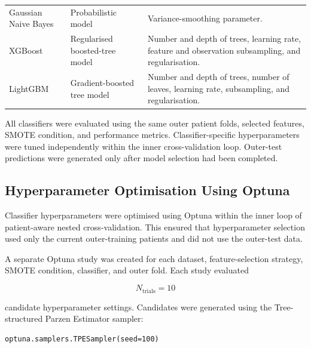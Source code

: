 \documentclass[12pt,twocolumn]{article}
\begin{document}
\begin{table}[htbp]
\begin{tabular}{p{3.1cm} p{3.7cm} p{8.9cm}}
Gaussian Naive Bayes &
Probabilistic model &
Variance-smoothing parameter. \\

XGBoost &
Regularised boosted-tree model &
Number and depth of trees, learning rate, feature and observation
subsampling, and regularisation. \\

LightGBM &
Gradient-boosted tree model &
Number and depth of trees, number of leaves, learning rate,
subsampling, and regularisation. \\

\bottomrule
\end{tabular}
\end{table}

All classifiers were evaluated using the same outer patient folds,
selected features, SMOTE condition, and performance metrics.
Classifier-specific hyperparameters were tuned independently within
the inner cross-validation loop. Outer-test predictions were generated
only after model selection had been completed.










\subsection{Hyperparameter Optimisation Using Optuna}
\label{subsec:hyperparameter_optimisation}

Classifier hyperparameters were optimised using Optuna within the
inner loop of patient-aware nested cross-validation. This ensured that
hyperparameter selection used only the current outer-training patients
and did not use the outer-test data.

A separate Optuna study was created for each dataset, feature-selection
strategy, SMOTE condition, classifier, and outer fold. Each study
evaluated

\begin{equation}
N_{\mathrm{trials}}=10
\label{eq:optuna_trials}
\end{equation}

candidate hyperparameter settings. Candidates were generated using the
Tree-structured Parzen Estimator sampler:

\begin{verbatim}
optuna.samplers.TPESampler(seed=100)
\end{verbatim}
\end{document}
